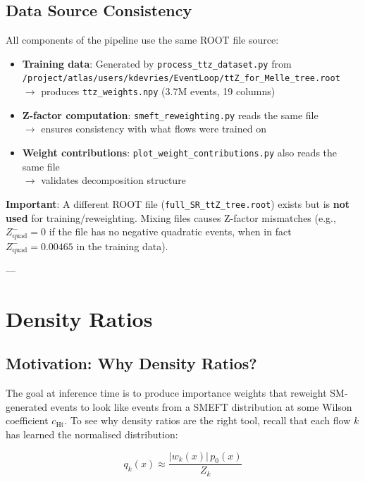 \documentclass[11pt,a4paper]{article}
\begin{document}
\subsection{Data Source Consistency}

All components of the pipeline use the same ROOT file source:
\begin{itemize}
  \item \textbf{Training data}: Generated by \texttt{process\_ttz\_dataset.py} from \\
        \texttt{/project/atlas/users/kdevries/EventLoop/ttZ\_for\_Melle\_tree.root} \\
        $\to$ produces \texttt{ttz\_weights.npy} (3.7M events, 19 columns)
  \item \textbf{Z-factor computation}: \texttt{smeft\_reweighting.py} reads the same file \\
        $\to$ ensures consistency with what flows were trained on
  \item \textbf{Weight contributions}: \texttt{plot\_weight\_contributions.py} also reads the same file \\
        $\to$ validates decomposition structure
\end{itemize}

\textbf{Important}: A different ROOT file (\texttt{full\_SR\_ttZ\_tree.root}) exists but is \textbf{not used} 
for training/reweighting. Mixing files causes Z-factor mismatches (e.g., $Z_{\text{quad}}^- = 0$ if the 
file has no negative quadratic events, when in fact $Z_{\text{quad}}^- = 0.00465$ in the training data).

---

\section{Density Ratios}

\subsection{Motivation: Why Density Ratios?}

The goal at inference time is to produce importance weights that reweight SM-generated events to look
like events from a SMEFT distribution at some Wilson coefficient $c_{\text{Ht}}$.  To see why density
ratios are the right tool, recall that each flow $k$ has learned the normalised distribution:

\begin{equation}
  q_k(x) \approx \frac{|w_k(x)|\,p_0(x)}{Z_k}
\end{equation}
\end{document}
